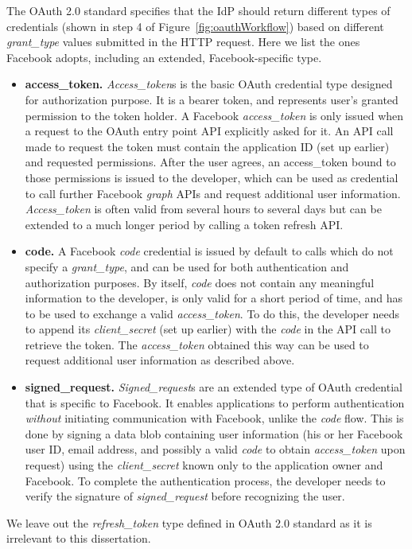 The OAuth 2.0 standard specifies that the IdP should return different types of credentials (shown in step 4 of Figure~\ref{fig:oauthWorkflow}) based on different \emph{grant\_type} values submitted in the HTTP request.  Here we list the ones Facebook adopts, including an extended, Facebook-specific type.

\begin{itemize}

\item \textbf{access\_token.} \emph{Access\_token}s is the basic OAuth credential type designed for authorization purpose.  It is a bearer token, and represents user's granted permission to the token holder.  A Facebook \emph{access\_token} is only issued when a request to the OAuth entry point API explicitly asked for it.  An API call made to request the token must contain the application ID (set up earlier) and requested permissions.  After the user agrees, an access\_token bound to those permissions is issued to the developer, which can be used as credential to call further Facebook \emph{graph} APIs and request additional user information.  \emph{Access\_token} is often valid from several hours to several days but can be extended to a much longer period by calling a token refresh API.

\item \textbf{code.} A Facebook \emph{code} credential is issued by default to calls which do not specify a \emph{grant\_type}, and can be used for both authentication and authorization purposes.  By itself, \emph{code} does not contain any meaningful information to the developer, is only valid for a short period of time, and has to be used to exchange a valid \emph{access\_token}.  To do this, the developer needs to append its \emph{client\_secret} (set up earlier) with the \emph{code} in the API call to retrieve the token.  The \emph{access\_token} obtained this way can be used to request additional user information as described above.

\item \textbf{signed\_request.} \emph{Signed\_request}s are an extended type of OAuth credential that is specific to Facebook.  It enables applications to perform authentication \emph{without} initiating communication with Facebook, unlike the \emph{code} flow.  This is done by signing a data blob containing user information (his or her Facebook user ID, email address, and possibly a valid \emph{code} to obtain \emph{access\_token} upon request) using the \emph{client\_secret} known only to the application owner and Facebook.  To complete the authentication process, the developer needs to verify the signature of \emph{signed\_request} before recognizing the user.

\end{itemize}

We leave out the \emph{refresh\_token} type defined in OAuth 2.0 standard as it is irrelevant to this dissertation.